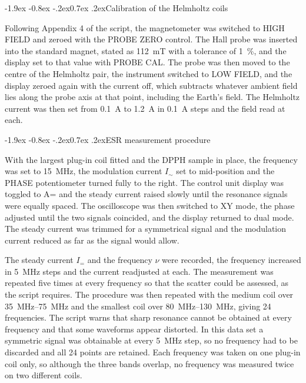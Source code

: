 \documentclass[11pt,a4paper]{article}
\makeatletter
\renewcommand\subsection{\@startsection{subsection}{2}{\z@}%
  {-1.9ex \@plus -0.8ex \@minus -.2ex}{0.7ex \@plus .2ex}{\normalfont\normalsize\bfseries}}
\makeatother
\begin{document}
\subsection{Calibration of the Helmholtz coils}

Following Appendix 4 of the script, the magnetometer was switched to HIGH FIELD and zeroed with
the PROBE ZERO control. The Hall probe was inserted into the standard magnet, stated as
\SI{112}{\milli\tesla} with a tolerance of \SI{1}{\percent}, and the display set to that value with
PROBE CAL. The probe was then moved to the centre of the Helmholtz pair, the instrument switched
to LOW FIELD, and the display zeroed again with the current off, which subtracts whatever ambient
field lies along the probe axis at that point, including the Earth's field. The Helmholtz current
was then set from \SI{0.1}{\ampere} to \SI{1.2}{\ampere} in \SI{0.1}{\ampere} steps and the field
read at each.

\subsection{ESR measurement procedure}

With the largest plug-in coil fitted and the DPPH sample in place, the frequency was set to
\SI{15}{\mega\hertz}, the modulation current $I_\sim$ set to mid-position and the PHASE
potentiometer turned fully to the right. The control unit display was toggled to A= and the steady
current raised slowly until the resonance signals were equally spaced. The oscilloscope was then
switched to XY mode, the phase adjusted until the two signals coincided, and the display returned
to dual mode. The steady current was trimmed for a symmetrical signal and the modulation current
reduced as far as the signal would allow.

The steady current $I_=$ and the frequency $\nu$ were recorded, the frequency increased in
\SI{5}{\mega\hertz} steps and the current readjusted at each. The measurement was repeated five
times at every frequency so that the scatter could be assessed, as the script requires. The
procedure was then repeated with the medium coil over \SIrange{35}{75}{\mega\hertz} and the
smallest coil over \SIrange{80}{130}{\mega\hertz}, giving 24 frequencies. The script warns that
sharp resonance cannot be obtained at every frequency and that some waveforms appear distorted.
In this data set a symmetric signal was obtainable at every \SI{5}{\mega\hertz} step, so no
frequency had to be discarded and all 24 points are retained. Each frequency was taken on one
plug-in coil only, so although the three bands overlap, no frequency was measured twice on two
different coils.
\end{document}
